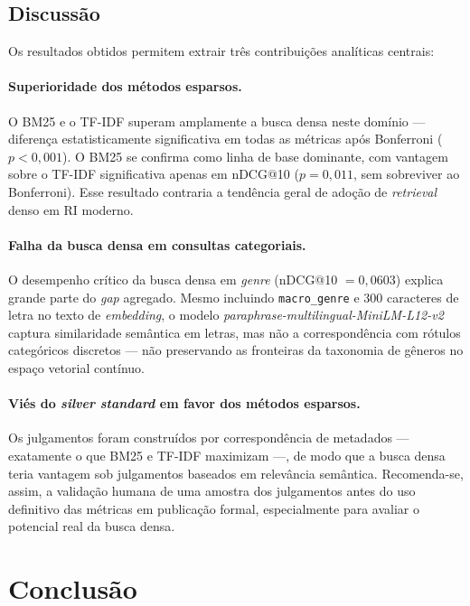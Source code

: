 \documentclass[12pt]{article}
\begin{document}
\subsection{Discussão}

Os resultados obtidos permitem extrair três contribuições analíticas centrais:

\paragraph{Superioridade dos métodos esparsos.} O BM25 e o TF-IDF superam
amplamente a busca densa neste domínio --- diferença estatisticamente
significativa em todas as métricas após Bonferroni ($p < 0{,}001$). O BM25 se
confirma como linha de base dominante, com vantagem sobre o TF-IDF significativa
apenas em nDCG@10 ($p = 0{,}011$, sem sobreviver ao Bonferroni). Esse resultado
contraria a tendência geral de adoção de \textit{retrieval} denso em RI moderno.

\paragraph{Falha da busca densa em consultas categoriais.} O desempenho crítico
da busca densa em \textit{genre} (nDCG@10 $= 0{,}0603$) explica grande parte do
\textit{gap} agregado. Mesmo incluindo \texttt{macro\_genre} e 300 caracteres de
letra no texto de \textit{embedding}, o modelo
\textit{paraphrase-multilingual-MiniLM-L12-v2} captura similaridade semântica em
letras, mas não a correspondência com rótulos categóricos discretos --- não
preservando as fronteiras da taxonomia de gêneros no espaço vetorial contínuo.

\paragraph{Viés do \textit{silver standard} em favor dos métodos esparsos.} Os
julgamentos foram construídos por correspondência de metadados --- exatamente o
que BM25 e TF-IDF maximizam ---, de modo que a busca densa teria vantagem sob
julgamentos baseados em relevância semântica. Recomenda-se, assim, a validação
humana de uma amostra dos julgamentos antes do uso definitivo das métricas em
publicação formal, especialmente para avaliar o potencial real da busca densa.

\section{Conclusão}
\label{sec:conclusao}
\end{document}
